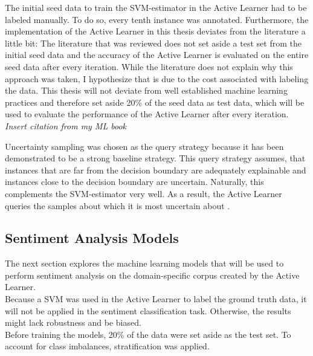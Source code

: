 \documentclass[11pt, a4paper]{article}
\begin{document}
The initial seed data to train the SVM-estimator in the Active Learner had to be labeled manually. To do so, every tenth instance was annotated.
Furthermore, the implementation of the Active Learner in this thesis deviates from the literature a little bit: The literature that was reviewed
does not set aside a test set from the initial seed data and the accuracy of the Active Learner is evaluated on the entire seed data after every iteration. 
While the literature does not explain why this approach was
taken, I hypothesize that is due to the cost associated with labeling the data. This thesis will not deviate from well established machine learning practices
and therefore set aside 20\% of the seed data as test data, which will be used to evaluate the performance of the Active Learner after every iteration. \emph{Insert citation from my ML book}

Uncertainty sampling was chosen as the query strategy because it has been demonstrated to be a strong baseline strategy. 
This query strategy assumes, that instances that are far from the decision boundary are adequately explainable and instances close to the 
decision boundary are uncertain. Naturally, this complements the SVM-estimator very well. As a result, the Active Learner queries 
the samples about which it is most uncertain about \citep{osbonre2004ensemblebased}.

\subsection{Sentiment Analysis Models} \label{subs:sentimentmodels}
The next section explores the machine learning models that will be used to perform sentiment analysis on the domain-specific corpus created by the Active Learner. \\
Because a SVM was used in the Active Learner to label the ground truth data, it will not be applied in the sentiment classification task. 
Otherwise, the results might lack robustness and be biased. \\
Before training the models, 20\% of the data were set aside as the test set. To account for class imbalances, stratification was applied.  
\end{document}
